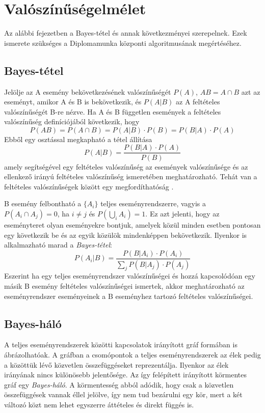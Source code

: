 \chapter{Valószínűségelmélet}

Az alábbi fejezetben a Bayes-tétel és annak következményei szerepelnek. Ezek ismerete szükséges a Diplomamunka központi algoritmusának megértéséhez.

\section{Bayes-tétel}
Jelölje az A esemény bekövetkezésének valószínűségét $P(A)$, $AB = A \cap B$ azt az eseményt, amikor A és B is bekövetkezik, és $P(A|B)$ az A feltételes valószínűségét B-re nézve. Ha A és B független események a feltételes valószínűség definíciójából következik, hogy
$$P(AB) = P(A \cap B) = P(A|B) \cdot P(B) =  P(B|A) \cdot P(A) $$
Ebből egy osztással megkapható a tétel állítása
$$P(A|B) = \frac{P(B|A) \cdot P(A)}{P(B)}$$
amely segítségével egy feltételes valószínűség az események valószínűsége és az ellenkező irányú feltételes valószínűség ismeretében meghatározható. Tehát van a feltételes valószínűségek között egy megfordíthatóság \cite{laszlo2011bayesi}.

B esemény felbontható a $\{A_i\}$ teljes eseményrendszerre, vagyis a $P(A_i \cap A_j) = 0$, ha $i \neq j$ és $ P(\bigcup_{i} A_i) = 1$. Ez azt jelenti, hogy az eseményteret olyan eseményekre bontjuk, amelyek közül minden esetben pontosan egy következik be és az egyik közülök mindenképpen bekövetkezik. Ilyenkor is alkalmazható marad a \emph{Bayes-tétel}:
$$P(A_i|B) = \frac{P(B|A_i) \cdot P(A_i)}{\sum_{j} P(B|A_j) \cdot P(A_j)}$$
Eszerint ha egy teljes eseményrendszer valószínűségei és hozzá kapcsolódóan egy másik B esemény feltételes valószínűségei ismertek, akkor meghatározható az eseményrendszer eseményeinek a B eseményhez tartozó feltételes valószínűségei.

\section{Bayes-háló}
A teljes eseményrendszerek közötti kapcsolatok irányított gráf formában is ábrázolhatóak. A gráfban a csomópontok a teljes eseményrendszerek az élek pedig a közöttük lévő közvetlen összefüggéseket reprezentálja. Ilyenkor az élek irányának nincs különösebb jelentősége. Az így felépített irányított körmentes gráf egy \emph{Bayes-háló}. A körmentesség abból adódik, hogy csak a közvetlen összefüggések vannak éllel jelölve, így nem tud bezárulni egy kör, mert a két változó közt nem lehet egyszerre áttételes és direkt függés is.


